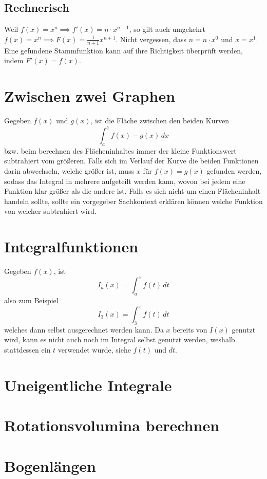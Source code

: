 \documentclass{article}
\begin{document}
\subsection{Rechnerisch}
Weil $f(x)=x^n \implies f'(x)=n \cdot x^{n-1}$, so gilt auch umgekehrt $f(x)=x^n \implies F(x)=\frac{1}{n+1}x^{n+1}$. Nicht vergessen, dass $n=n \cdot x^0$ und $x=x^1$. Eine gefundene Stammfunktion kann auf ihre Richtigkeit überprüft werden, indem $F'(x)=f(x)$.
 
\section{Zwischen zwei Graphen} 
Gegeben $f(x)$ und $g(x)$, ist die Fläche zwischen den beiden Kurven
\[\int_a^b f(x)-g(x) \,dx\]  
bzw. beim berechnen des Flächeninhaltes immer der kleine Funktionswert subtrahiert vom größeren. Falls sich im Verlauf der Kurve die beiden Funktionen darin abwechseln, welche größer ist, muss $x$ für $f(x)=g(x)$ gefunden werden, sodass das Integral in mehrere aufgeteilt werden kann, wovon bei jedem eine Funktion klar größer als die andere ist. \newline
Falls es sich nicht um einen Flächeninhalt handeln sollte, sollte ein vorgegeber Sachkontext erklären können welche Funktion von welcher subtrahiert wird.
 
\section{Integralfunktionen}
Gegeben $f(x)$, ist 
\[I_a(x)=\int_a^x f(t) \,dt\]
also zum Beispiel
\[I_3(x)=\int_3^x f(t) \,dt\]
welches dann selbst ausgerechnet werden kann. \newline
Da $x$ bereits von $I(x)$ genutzt wird, kann es nicht auch noch im Integral selbst genutzt werden, weshalb stattdessen ein $t$ verwendet wurde, siehe $f(t)$ und $dt$.
 
\section{Uneigentliche Integrale} 
 
\section{Rotationsvolumina berechnen} 
 
\section{Bogenlängen} 
 
\end{document}
